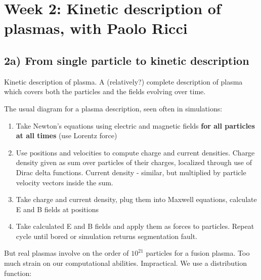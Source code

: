 \section{Week 2: Kinetic description of plasmas, with Paolo Ricci}
\subsection{2a) From single particle to kinetic description }
	Kinetic description of plasma. A (relatively?) complete description of plasma which covers both the particles and the fields evolving over time.

The usual diagram for a plasma description, seen often in simulations:
\begin{enumerate}
	\item Take Newton's equations using electric and magnetic fields \textbf{for all particles at all times} (use Lorentz force)
	\item Use positions and velocities to compute charge and current densities. Charge density given as sum over particles of their charges, localized through use of Dirac delta functions. Current density - similar, but multiplied by particle velocity vectors inside the sum.
	\item Take charge and current density, plug them into Maxwell equations, calculate E and B fields at positions
	\item Take calculated E and B fields and apply them as forces to particles. Repeat cycle until bored or simulation returns segmentation fault.
\end{enumerate}
But real plasmas involve on the order of $10^21$ particles for a fusion plasma. Too much strain on our computational abilities. Impractical. We use a distribution function:

